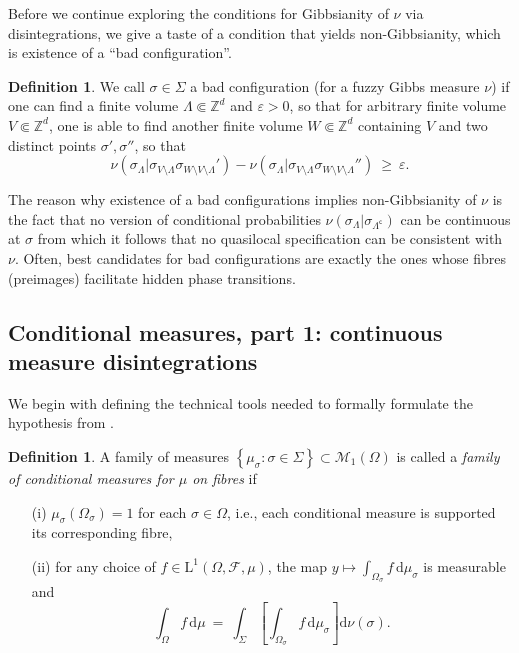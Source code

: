 \documentclass[12pt]{article}
\renewcommand{\d}{\mathrm{d}}
\newcommand{\F}{\mathcal{F}}
\newcommand{\M}{\mathcal{M}}
\newcommand{\Z}{\mathbb{Z}}
\newcommand{\set}[1]{\left\{#1\right\}}
\newcommand{\oglati}[1]{\left[#1\right]}
\newcommand{\1}{\mathbbm{1}}
\renewcommand{\c}{\mathsf{c}}
\newcommand{\5}{\vspace{0.5cm}}
\theoremstyle{definition}
\newtheorem{df}[thm]{Definition}
\begin{document}
Before we continue exploring the conditions for Gibbsianity of $\nu$ via disintegrations, we give a taste of a condition that yields non-Gibbsianity, which is existence of a ``bad configuration''.

\begin{df}
We call $\sigma\in\Sigma$ a bad configuration (for a fuzzy Gibbs measure $\nu$) if one can find a finite volume $\Lambda\Subset\Z^d$ and $\varepsilon>0$, so that for arbitrary finite volume $V\Subset\Z^d$, one is able to find another finite volume $W\Subset\Z^d$ containing $V$ and two distinct points $\sigma',\sigma''$, so that
$$\nu(\sigma_\Lambda|\sigma_{V\setminus\Lambda}\sigma_{W\setminus V\setminus\Lambda}')-\nu(\sigma_\Lambda|\sigma_{V\setminus\Lambda}\sigma_{W\setminus V\setminus\Lambda}'') ~\geq~ \varepsilon.$$
\end{df}
The reason why existence of a bad configurations implies non-Gibbsianity of $\nu$ is the fact that no version of conditional probabilities $\nu(\sigma_\Lambda|\sigma_{\Lambda^\c})$ can be continuous at $\sigma$ from which it follows that no quasilocal specification can be consistent with $\nu$. Often, best candidates for bad configurations are exactly the ones whose fibres (preimages) facilitate hidden phase transitions.


\subsection{Conditional measures, part 1: continuous measure disintegrations}\label{sec:2.2}

We begin with defining the technical tools needed to formally formulate the hypothesis from \cite{EFS}.

\begin{df}\label{def:MeasureDisint}
A family of measures $\set{\mu_\sigma:\sigma\in\Sigma}\subset\M_1(\Omega)$ is called a \textit{family of conditional measures for $\mu$ on fibres} if
\begin{itemize}
	\item[(i)] $\mu_\sigma(\Omega_\sigma)=1$ for each $\sigma\in\Omega$, i.e., each conditional measure is supported its corresponding fibre,
	\item[(ii)] for any choice of $f\in\mathrm{L}^1(\Omega,\F,\mu)$, the map $y\mapsto\int_{\Omega_\sigma} f\,\d\mu_\sigma$ is measurable and
	$$\int_\Omega f\,\d\mu ~=~ \int_{\Sigma}\!\oglati{\int_{\Omega_\sigma} f\,\d\mu_\sigma}\!\d\nu(\sigma).$$
\end{itemize}
\end{df}
\end{document}
